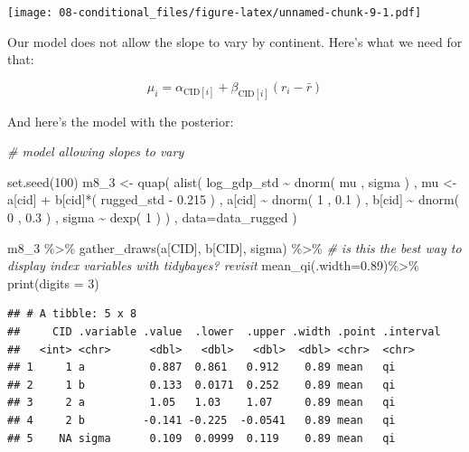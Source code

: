 \documentclass[
]{book}
\newenvironment{Shaded}{\begin{snugshade}}{\end{snugshade}}
\newcommand{\AttributeTok}[1]{\textcolor[rgb]{0.77,0.63,0.00}{#1}}
\newcommand{\CommentTok}[1]{\textcolor[rgb]{0.56,0.35,0.01}{\textit{#1}}}
\newcommand{\DecValTok}[1]{\textcolor[rgb]{0.00,0.00,0.81}{#1}}
\newcommand{\FloatTok}[1]{\textcolor[rgb]{0.00,0.00,0.81}{#1}}
\newcommand{\FunctionTok}[1]{\textcolor[rgb]{0.00,0.00,0.00}{#1}}
\newcommand{\NormalTok}[1]{#1}
\newcommand{\OtherTok}[1]{\textcolor[rgb]{0.56,0.35,0.01}{#1}}
\newcommand{\SpecialCharTok}[1]{\textcolor[rgb]{0.00,0.00,0.00}{#1}}
\begin{document}
\texttt{[image: 08-conditional\_files/figure-latex/unnamed-chunk-9-1.pdf]}

Our model does not allow the slope to vary by continent. Here's what we need for that:

\[
\mu_i = \alpha_{\text{CID}[i]} + \beta_{\text{CID}[i]}(r_i - \bar{r})
\]

And here's the model with the posterior:

\begin{Shaded}
\begin{Highlighting}[]
\CommentTok{\# model allowing slopes to vary}

\FunctionTok{set.seed}\NormalTok{(}\DecValTok{100}\NormalTok{)}
\NormalTok{m8\_3 }\OtherTok{\textless{}{-}} \FunctionTok{quap}\NormalTok{( }\FunctionTok{alist}\NormalTok{(}
\NormalTok{log\_gdp\_std }\SpecialCharTok{\textasciitilde{}} \FunctionTok{dnorm}\NormalTok{( mu , sigma ) , }
\NormalTok{mu }\OtherTok{\textless{}{-}}\NormalTok{ a[cid] }\SpecialCharTok{+}\NormalTok{ b[cid]}\SpecialCharTok{*}\NormalTok{( rugged\_std }\SpecialCharTok{{-}} \FloatTok{0.215}\NormalTok{ ) , }
\NormalTok{a[cid] }\SpecialCharTok{\textasciitilde{}} \FunctionTok{dnorm}\NormalTok{( }\DecValTok{1}\NormalTok{ , }\FloatTok{0.1}\NormalTok{ ) , }
\NormalTok{b[cid] }\SpecialCharTok{\textasciitilde{}} \FunctionTok{dnorm}\NormalTok{( }\DecValTok{0}\NormalTok{ , }\FloatTok{0.3}\NormalTok{ ) , }
\NormalTok{sigma }\SpecialCharTok{\textasciitilde{}} \FunctionTok{dexp}\NormalTok{( }\DecValTok{1}\NormalTok{ )}
\NormalTok{) , }\AttributeTok{data=}\NormalTok{data\_rugged )  }

\NormalTok{m8\_3 }\SpecialCharTok{\%\textgreater{}\%}
  \FunctionTok{gather\_draws}\NormalTok{(a[CID], b[CID], sigma) }\SpecialCharTok{\%\textgreater{}\%} \CommentTok{\# is this the best way to display index variables with tidybayes? revisit}
  \FunctionTok{mean\_qi}\NormalTok{(}\AttributeTok{.width=}\FloatTok{0.89}\NormalTok{)}\SpecialCharTok{\%\textgreater{}\%}
  \FunctionTok{print}\NormalTok{(}\AttributeTok{digits =} \DecValTok{3}\NormalTok{)}
\end{Highlighting}
\end{Shaded}

\begin{verbatim}
## # A tibble: 5 x 8
##     CID .variable .value  .lower  .upper .width .point .interval
##   <int> <chr>      <dbl>   <dbl>   <dbl>  <dbl> <chr>  <chr>    
## 1     1 a          0.887  0.861   0.912    0.89 mean   qi       
## 2     1 b          0.133  0.0171  0.252    0.89 mean   qi       
## 3     2 a          1.05   1.03    1.07     0.89 mean   qi       
## 4     2 b         -0.141 -0.225  -0.0541   0.89 mean   qi       
## 5    NA sigma      0.109  0.0999  0.119    0.89 mean   qi
\end{verbatim}
\end{document}
